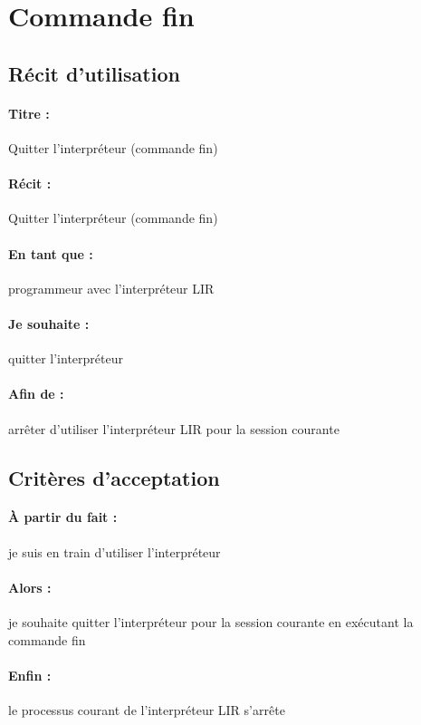     \section{Commande fin}

    \subsection*{Récit d'utilisation}

    \paragraph{Titre : } Quitter l'interpréteur (commande fin)
    \paragraph{Récit : } Quitter l'interpréteur (commande fin)
    \paragraph{En tant que : } programmeur avec l'interpréteur LIR
    \paragraph{Je souhaite : } quitter l'interpréteur
    \paragraph{Afin de : } arrêter d'utiliser l'interpréteur LIR pour la session courante

    \subsection*{Critères d'acceptation}

    \paragraph{À partir du fait : } je suis en train d'utiliser l'interpréteur
    \paragraph{Alors : } je souhaite quitter l'interpréteur pour la session courante en exécutant la commande fin
    \paragraph{Enfin : } le processus courant de l'interpréteur LIR s'arrête